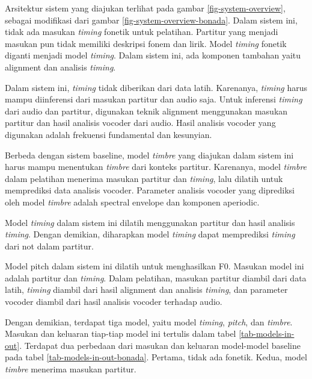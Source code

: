 Arsitektur sistem yang diajukan terlihat pada gambar \ref{fig-system-overview}, sebagai modifikasi dari gambar \ref{fig-system-overview-bonada}. Dalam sistem ini, tidak ada masukan \textit{timing} fonetik untuk pelatihan. Partitur yang menjadi masukan pun tidak memiliki deskripsi fonem dan lirik. Model \textit{timing} fonetik diganti menjadi model \textit{timing}. Dalam sistem ini, ada komponen tambahan yaitu alignment dan analisis \textit{timing}.

Dalam sistem ini, \textit{timing} tidak diberikan dari data latih. Karenanya, \textit{timing} harus mampu diinferensi dari masukan partitur dan audio saja. Untuk inferensi \textit{timing} dari audio dan partitur, digunakan teknik alignment menggunakan masukan partitur dan hasil analisis vocoder dari audio. Hasil analisis vocoder yang digunakan adalah frekuensi fundamental dan kesunyian.

Berbeda dengan sistem baseline, model \textit{timbre} yang diajukan dalam sistem ini harus mampu menentukan \textit{timbre} dari konteks partitur. Karenanya, model \textit{timbre} dalam pelatihan menerima masukan partitur dan \textit{timing}, lalu dilatih untuk memprediksi data analisis vocoder. Parameter analisis vocoder yang diprediksi oleh model \textit{timbre} adalah spectral envelope dan komponen aperiodic.

Model \textit{timing} dalam sistem ini dilatih menggunakan partitur dan hasil analisis \textit{timing}. Dengan demikian, diharapkan model \textit{timing} dapat memprediksi \textit{timing} dari not dalam partitur.

Model pitch dalam sistem ini dilatih untuk menghasilkan F0. Masukan model ini adalah partitur dan \textit{timing}. Dalam pelatihan, masukan partitur diambil dari data latih, \textit{timing} diambil dari hasil alignment dan analisis \textit{timing}, dan parameter vocoder diambil dari hasil analisis vocoder terhadap audio.

Dengan demikian, terdapat tiga model, yaitu model \textit{timing}, \textit{pitch}, dan \textit{timbre}. Masukan dan keluaran tiap-tiap model ini tertulis dalam tabel \ref{tab-models-in-out}. Terdapat dua perbedaan dari masukan dan keluaran model-model baseline pada tabel \ref{tab-models-in-out-bonada}. Pertama, tidak ada fonetik. Kedua, model \textit{timbre} menerima masukan partitur.

